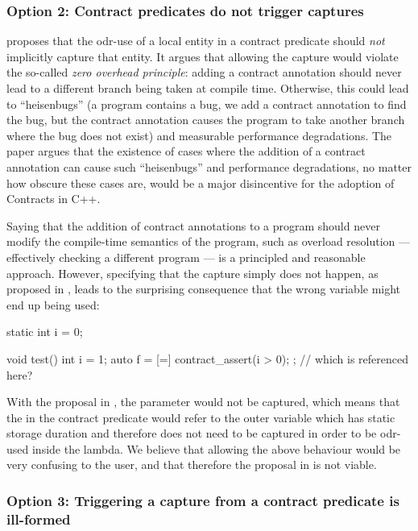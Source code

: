 \subsubsection{Option 2: Contract predicates do not trigger captures}

\cite{P2932R2} proposes that the odr-use of a local entity in a contract predicate should \emph{not} implicitly capture that entity. It argues that allowing the capture would violate the so-called \emph{zero overhead principle}: adding a contract annotation should never lead to a different branch being taken at compile time. Otherwise, this could lead to ``heisenbugs'' (a program contains a bug, we add a contract annotation to find the bug, but the contract annotation causes the program to take another branch where the bug does not exist) and measurable performance degradations. The paper argues that the existence of cases where the addition of a contract annotation can cause such ``heisenbugs'' and performance degradations, no matter how obscure these cases are, would be a major disincentive for the adoption of Contracts in C++.

Saying that the addition of contract annotations to a program should never modify the compile-time semantics of the program, such as overload resolution --- effectively checking a different program --- is a principled and reasonable approach. However, specifying that the capture simply does not happen, as proposed in \cite{P2932R2}, leads to the surprising consequence that the wrong variable might end up being used:

\begin{codeblock}
static int i = 0;

void test() {
  int i = 1;
  auto f = [=] { contract_assert(i > 0); };   // which  is referenced here?
}
\end{codeblock}

With the proposal in \cite{P2932R2}, the parameter  would not be captured, which means that the  in the contract predicate would refer to the outer  variable which has static storage duration and therefore does not need to be captured in order to be odr-used inside the lambda. We believe that allowing the above behaviour would be very confusing to the user, and that therefore the proposal in \cite{P2932R2} is not viable.
 
 \subsubsection{Option 3: Triggering a capture from a contract predicate is ill-formed}
 
